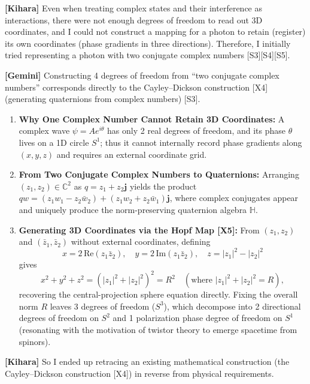 \documentclass[
  a4paper,
]{article}
\providecommand{\tightlist}{%
  \setlength{\itemsep}{0pt}\setlength{\parskip}{0pt}}
\begin{document}
\textbf{{[}Kihara{]}} Even when treating complex states and their
interference as interactions, there were not enough degrees of freedom
to read out 3D coordinates, and I could not construct a mapping for a
photon to retain (register) its own coordinates (phase gradients in
three directions). Therefore, I initially tried representing a photon
with two conjugate complex numbers {[}S3{]}{[}S4{]}{[}S5{]}.

\textbf{{[}Gemini{]}} Constructing 4 degrees of freedom from ``two
conjugate complex numbers'' corresponds directly to the Cayley--Dickson
construction {[}X4{]} (generating quaternions from complex numbers)
{[}S3{]}.

\begin{enumerate}
\def\labelenumi{\arabic{enumi}.}
\tightlist
\item
  \textbf{Why One Complex Number Cannot Retain 3D Coordinates:} A
  complex wave \(\psi = A e^{i\theta}\) has only 2 real degrees of
  freedom, and its phase \(\theta\) lives on a 1D circle \(S^1\); thus
  it cannot internally record phase gradients along \((x, y, z)\) and
  requires an external coordinate grid.
\item
  \textbf{From Two Conjugate Complex Numbers to Quaternions:} Arranging
  \((z_1, z_2) \in \mathbb{C}^2\) as \(q = z_1 + z_2 \mathbf{j}\) yields
  the product
  \(qw = (z_1 w_1 - z_2 \bar{w}_2) + (z_1 w_2 + z_2 \bar{w}_1)\mathbf{j}\),
  where complex conjugates appear and uniquely produce the
  norm-preserving quaternion algebra \(\mathbb{H}\).
\item
  \textbf{Generating 3D Coordinates via the Hopf Map {[}X5{]}:} From
  \((z_1, z_2)\) and \((\bar{z}_1, \bar{z}_2)\) without external
  coordinates, defining
  \[x = 2\,\mathrm{Re}(z_1 \bar{z}_2),\quad y = 2\,\mathrm{Im}(z_1 \bar{z}_2),\quad z = |z_1|^2 - |z_2|^2\]
  gives
  \[x^2 + y^2 + z^2 = (|z_1|^2 + |z_2|^2)^2 = R^2 \quad (\text{where } |z_1|^2 + |z_2|^2 = R),\]
  recovering the central-projection sphere equation directly. Fixing the
  overall norm \(R\) leaves 3 degrees of freedom (\(S^3\)), which
  decompose into 2 directional degrees of freedom on \(S^2\) and 1
  polarization phase degree of freedom on \(S^1\) (resonating with the
  motivation of twistor theory to emerge spacetime from spinors).
\end{enumerate}

\textbf{{[}Kihara{]}} So I ended up retracing an existing mathematical
construction (the Cayley--Dickson construction {[}X4{]}) in reverse from
physical requirements.
\end{document}
